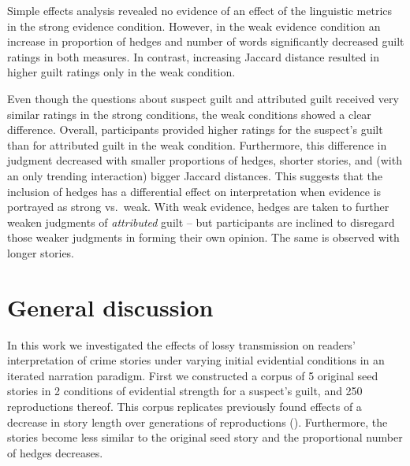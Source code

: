 \documentclass[10pt,letterpaper]{article}
\newcommand{\ek}[1]{\textcolor{Orange}{[ek: #1]}}
\newcommand{\jd}[1]{\textcolor{Green}{[jd: #1]}}
\begin{document}
Simple effects analysis revealed no evidence of an effect of the linguistic metrics in the strong evidence condition. However, in the weak evidence condition an increase in proportion of hedges and number of words significantly decreased guilt ratings in both measures. In contrast, increasing Jaccard distance resulted in higher guilt ratings only in the weak condition.

Even though the questions about suspect guilt and attributed guilt received very similar ratings in the strong conditions, the weak conditions showed a clear difference. Overall, participants provided higher ratings for the suspect's guilt than for attributed guilt in the weak condition. Furthermore, this difference in judgment decreased with smaller proportions of hedges, shorter stories, and (with an only trending interaction)  bigger Jaccard distances. This suggests that the inclusion of hedges has a differential effect on interpretation when evidence is portrayed as strong vs.~weak. With weak evidence, hedges are taken to further weaken judgments of \emph{attributed} guilt -- but participants are inclined to disregard those weaker judgments in forming their own opinion. The same is observed with longer stories.  %




\section{General discussion}

In this work we investigated the effects of lossy transmission on readers' interpretation of crime stories under varying initial evidential conditions in an iterated narration paradigm. First we constructed a corpus of 5 original seed stories in 2 conditions of evidential strength for a suspect's guilt, and 250 reproductions thereof. This corpus  replicates previously found effects of a decrease in story length over generations of reproductions (\cite{Bartlett:1932}). Furthermore, the stories become less similar to the original seed story and the proportional number of hedges decreases.
\end{document}

